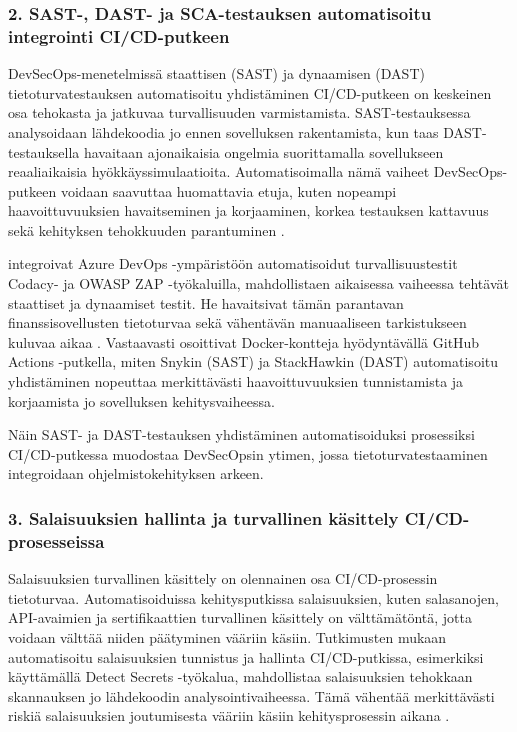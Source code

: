 \documentclass[bscthesis,finnish,oneside,biblatex]{uefcsthesis}
\begin{document}
    \subsubsection{2. SAST-, DAST- ja SCA-testauksen automatisoitu integrointi CI/CD-putkeen}

    DevSecOps-menetelmissä staattisen (SAST) ja dynaamisen (DAST) tietoturvatestauksen automatisoitu yhdistäminen CI/CD-putkeen on keskeinen osa tehokasta ja jatkuvaa turvallisuuden varmistamista. SAST-testauksessa analysoidaan lähdekoodia jo ennen sovelluksen rakentamista, kun taas DAST-testauksella havaitaan ajonaikaisia ongelmia suorittamalla sovellukseen reaaliaikaisia hyökkäyssimulaatioita. Automatisoimalla nämä vaiheet DevSecOps-putkeen voidaan saavuttaa huomattavia etuja, kuten nopeampi haavoittuvuuksien havaitseminen ja korjaaminen, korkea testauksen kattavuus sekä kehityksen tehokkuuden parantuminen \cite{feio2024_empirical,kushwaha2024_cct}.

    \cite{kushwaha2024_cct} integroivat Azure DevOps -ympäristöön automatisoidut turvallisuustestit Codacy- ja OWASP ZAP -työkaluilla, mahdollistaen aikaisessa vaiheessa tehtävät staattiset ja dynaamiset testit. He havaitsivat tämän parantavan finanssisovellusten tietoturvaa sekä vähentävän manuaaliseen tarkistukseen kuluvaa aikaa \cite{kushwaha2024_cct}. Vastaavasti \cite{marandi2023_ias} osoittivat Docker-kontteja hyödyntävällä GitHub Actions -putkella, miten Snykin (SAST) ja StackHawkin (DAST) automatisoitu yhdistäminen nopeuttaa merkittävästi haavoittuvuuksien tunnistamista ja korjaamista jo sovelluksen kehitysvaiheessa.

    Näin SAST- ja DAST-testauksen yhdistäminen automatisoiduksi prosessiksi CI/CD-putkessa muodostaa DevSecOpsin ytimen, jossa tietoturvatestaaminen integroidaan ohjelmistokehityksen arkeen.

    \subsubsection{3. Salaisuuksien hallinta ja turvallinen käsittely CI/CD-prosesseissa}

    Salaisuuksien turvallinen käsittely on olennainen osa CI/CD-prosessin tietoturvaa. Automatisoiduissa kehitysputkissa salaisuuksien, kuten salasanojen, API-avaimien ja sertifikaattien turvallinen käsittely on välttämätöntä, jotta voidaan välttää niiden päätyminen vääriin käsiin. Tutkimusten mukaan automatisoitu salaisuuksien tunnistus ja hallinta CI/CD-putkissa, esimerkiksi käyttämällä Detect Secrets -työkalua, mahdollistaa salaisuuksien tehokkaan skannauksen jo lähdekoodin analysointivaiheessa. Tämä vähentää merkittävästi riskiä salaisuuksien joutumisesta vääriin käsiin kehitysprosessin aikana \cite{aljohani2023_automating}.
\end{document}
